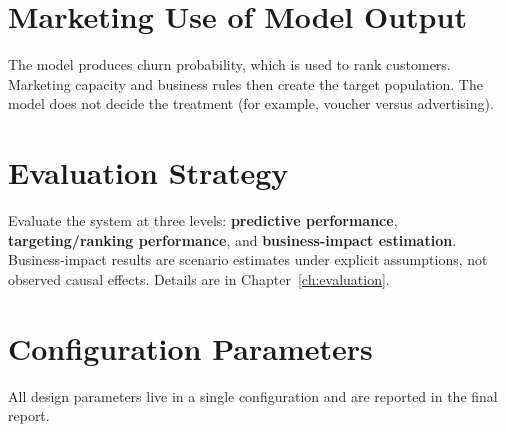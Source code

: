 \section{Marketing Use of Model Output}
\label{sec:3-13}

The model produces churn probability, which is used to rank customers. Marketing capacity and business rules then create the target population. The model does not decide the treatment (for example, voucher versus advertising).

\section{Evaluation Strategy}
\label{sec:3-14}

Evaluate the system at three levels: \textbf{predictive performance}, \textbf{targeting/ranking performance}, and \textbf{business-impact estimation}. Business-impact results are scenario estimates under explicit assumptions, not observed causal effects. Details are in Chapter~\ref{ch:evaluation}.

\section{Configuration Parameters}
\label{sec:3-15}

All design parameters live in a single configuration and are reported in the final report.

